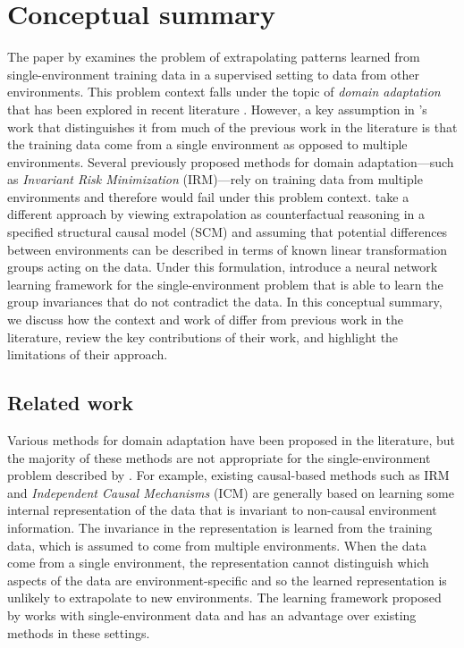 

\section{Conceptual summary}\label{sec:conceptual}

The paper by \textcite{Mouli:2021} examines the problem of extrapolating patterns learned from single-environment training data in a supervised setting to data from other environments. This problem context falls under the topic of \textit{domain adaptation} that has been explored in recent literature \parencite{Farahani:2020}. However, a key assumption in \citeauthor{Mouli:2021}'s work that distinguishes it from much of the previous work in the literature is that the training data come from a single environment as opposed to multiple environments. Several previously proposed methods for domain adaptation---such as \textit{Invariant Risk Minimization} \parencite{Arjovsky:2020} (IRM)---rely on training data from multiple environments and therefore would fail under this problem context. \citeauthor{Mouli:2021} take a different approach by viewing extrapolation as counterfactual reasoning in a specified structural causal model (SCM) and assuming that potential differences between environments can be described in terms of known linear transformation groups acting on the data. Under this formulation, \citeauthor{Mouli:2021} introduce a neural network learning framework for the single-environment problem that is able to learn the group invariances that do not contradict the data. In this conceptual summary, we discuss how the context and work of \textcite{Mouli:2021} differ from previous work in the literature, review the key contributions of their work, and highlight the limitations of their approach.


\subsection{Related work}

Various methods for domain adaptation have been proposed in the literature, but the majority of these methods are not appropriate for the single-environment problem described by \textcite{Mouli:2021}. For example, existing causal-based methods such as IRM and \textit{Independent Causal Mechanisms} \parencite{Parascandolo:2018} (ICM) are generally based on learning some internal representation of the data that is invariant to non-causal environment information. The invariance in the representation is learned from the training data, which is assumed to come from multiple environments. When the data come from a single environment, the representation cannot distinguish which aspects of the data are environment-specific and so the learned representation is unlikely to extrapolate to new environments. The learning framework proposed by \citeauthor{Mouli:2021} works with single-environment data and has an advantage over existing methods in these settings.
\\

